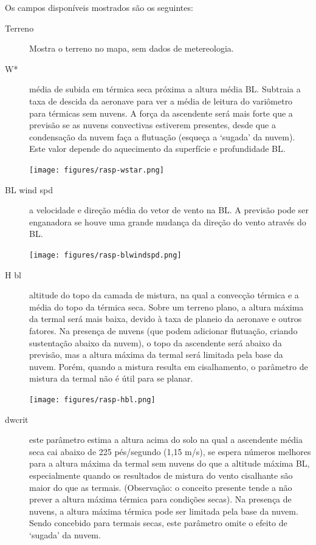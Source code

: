 Os campos disponíveis mostrados são os seguintes:
\begin{description}
\item[Terreno] Mostra o terreno no mapa, sem dados de metereologia.

\item[W*] 
média de subida em térmica seca próxima a altura média BL.
Subtraia a taxa de descida da aeronave para ver a média de leitura do variômetro para térmicas sem nuvens.  A força da ascendente será mais forte que a previsão se as nuvens convectivas estiverem presentes, desde que a condensação da nuvem faça a flutuação (esqueça a ‘sugada’ da nuvem).  Este valor depende do aquecimento da superfície e profundidade BL.  


\begin{center}
\texttt{[image: figures/rasp-wstar.png]}
\end{center}

\item[BL wind spd] 
a velocidade e direção média do vetor de vento na BL.  A previsão pode ser enganadora se houve uma grande mudança da direção do vento através do BL.  

\begin{center}
\texttt{[image: figures/rasp-blwindspd.png]}
\end{center}

\item[H bl]  
altitude do topo da camada de mistura, na qual a convecção térmica e a média do topo da térmica seca.  Sobre um terreno plano, a altura máxima da termal será mais baixa, devido à taxa de planeio da aeronave e outros fatores.  Na presença de nuvens (que podem adicionar flutuação, criando sustentação abaixo da nuvem), o topo da ascendente será abaixo da previsão, mas a altura máxima da termal será limitada pela base da nuvem.  Porém, quando a mistura resulta em cisalhamento, o parâmetro de mistura da termal não é útil para se planar.

\begin{center}
\texttt{[image: figures/rasp-hbl.png]}
\end{center}

\item[dwcrit]  
este parâmetro estima a altura acima do solo na qual a ascendente média seca cai abaixo de 225 pés/segundo (1,15 m/s), se espera números melhores para a altura máxima da termal sem nuvens do que a altitude máxima BL, especialmente quando os resultados de mistura do vento cisalhante são maior do que as termais. (Observação: o conceito presente tende a não prever a altura máxima térmica para condições secas).  Na presença de nuvens, a altura máxima térmica pode ser limitada pela base da nuvem.  Sendo concebido para termais secas, este parâmetro omite o efeito de ‘sugada’ da nuvem.  


\end{description}
